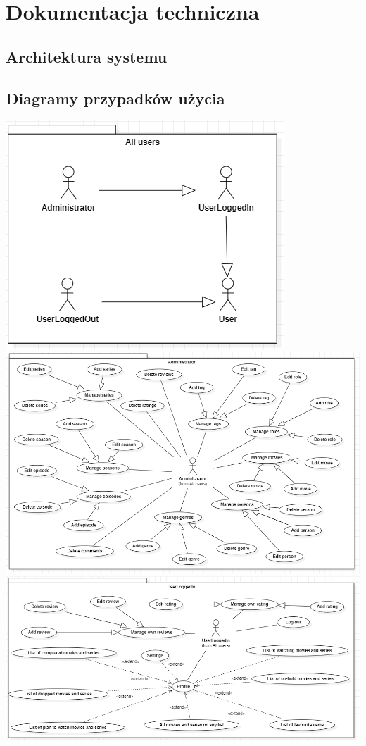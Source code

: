\documentclass[12pt]{article}
\begin{document}
	\section{Dokumentacja techniczna}
	
		\subsection{Architektura systemu}
		
		\subsection{Diagramy przypadków użycia}
			\includegraphics[scale=0.9]{UseCase_AllUsers.png} \linebreak
			\includegraphics[scale=0.7]{UseCase_Administrator.png} \linebreak
			\includegraphics[scale=0.7]{UseCase_UserLoggedIn.png} \linebreak
\end{document}
